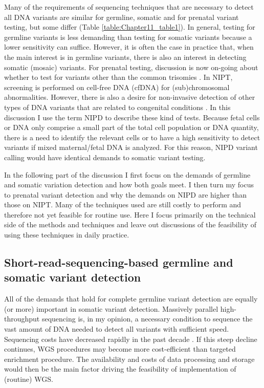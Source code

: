 Many of the requirements of sequencing techniques that are necessary to detect all DNA variants are similar for germline, somatic and for prenatal variant testing, but some differ (Table
\ref{table:Chapter11_table1}). 
In general, testing for germline variants is less demanding than testing for somatic variants because a lower sensitivity can suffice. 
However, it is often the case in practice that, when the main interest is in germline variants, there is also an interest in detecting somatic (mosaic) variants. 
For prenatal testing, discussion is now on-going about whether to test for variants other than the
common trisomies \cite{Bowman_Smart_2019}. In NIPT, screening is performed on cell-free DNA (cfDNA) for (sub)chromosomal abnormalities. 
However, there is also a desire for non-invasive detection of other types of DNA variants that are related to congenital conditions \cite{Hayward_2018}. 
In this discussion I use the term NIPD to describe these kind of tests. 
Because fetal cells or DNA only comprise a small part of the total cell population or DNA quantity, there is a need to identify the relevant cells or to have a high sensitivity to detect variants if mixed maternal/fetal DNA is analyzed. 
For this reason, NIPD variant calling would have identical demands to somatic variant testing.

In the following part of the discussion I first focus on the demands of germline and somatic variation detection and how both goals meet. 
I then turn my focus to prenatal variant detection and why the demands on NIPD are higher than those on NIPT. 
Many of the techniques used are still costly to perform and therefore not yet feasible for routine use. 
Here I focus primarily on the technical side of the methods and techniques and leave out discussions of the feasibility of using these techniques in daily practice.


\subsection[Short-read-sequencing-based variant detection]{Short-read-sequencing-based germline and somatic variant detection}
All of the demands that hold for complete germline variant detection are equally (or more) important in somatic variant detection. 
Massively parallel high-throughput sequencing is, in my opinion, a necessary condition to sequence the vast amount of DNA needed to detect all variants with sufficient speed. 
Sequencing costs have decreased rapidly in the past decade \cite{Wetterstrand_2018}. 
If this steep decline continues, WGS procedures may become more cost-efficient than targeted enrichment procedure. 
The availability and costs of data processing and storage would then be the main factor driving the feasibility of implementation of (routine) WGS. 


